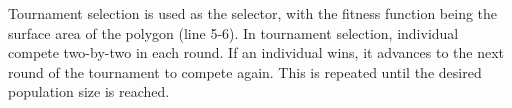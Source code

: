 Tournament selection is used as the selector, with the fitness function being the surface area of the polygon (line 5-6). In tournament selection, individual compete two-by-two in each round. If an individual wins, it advances to the next round of the tournament to compete again. This is repeated until the desired population size is reached.

